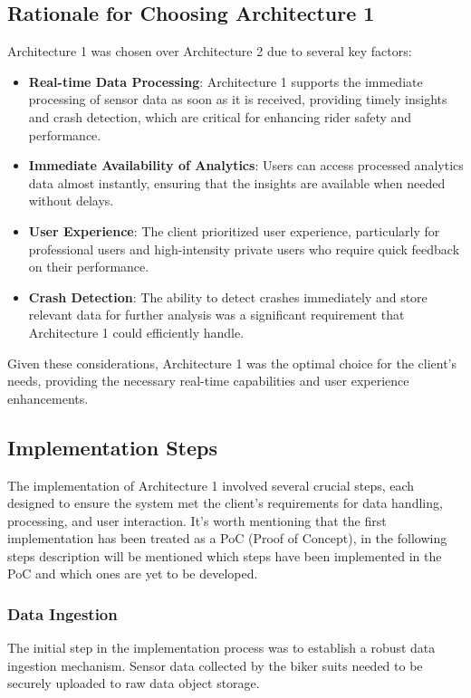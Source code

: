 \subsection{Rationale for Choosing Architecture 1}
Architecture 1 was chosen over Architecture 2 due to several key factors:
\begin{itemize}
    \item \textbf{Real-time Data Processing}: Architecture 1 supports the immediate processing of sensor data as soon as it is received, providing timely insights and crash detection, which are critical for enhancing rider safety and performance.
    \item \textbf{Immediate Availability of Analytics}: Users can access processed analytics data almost instantly, ensuring that the insights are available when needed without delays.
    \item \textbf{User Experience}: The client prioritized user experience, particularly for professional users and high-intensity private users who require quick feedback on their performance.
    \item \textbf{Crash Detection}: The ability to detect crashes immediately and store relevant data for further analysis was a significant requirement that Architecture 1 could efficiently handle.
\end{itemize}

Given these considerations, Architecture 1 was the optimal choice for the client's needs, providing the necessary real-time capabilities and user experience enhancements.

\subsection{Implementation Steps}
The implementation of Architecture 1 involved several crucial steps, each designed to ensure the system met the client's requirements for data handling, processing, and user interaction. It's worth mentioning that the first implementation has been treated as a PoC (Proof of Concept), in the following steps description will be mentioned which steps have been implemented in the PoC and which ones are yet to be developed.

\subsubsection{Data Ingestion}
The initial step in the implementation process was to establish a robust data ingestion mechanism. Sensor data collected by the biker suits needed to be securely uploaded to raw data object storage.


